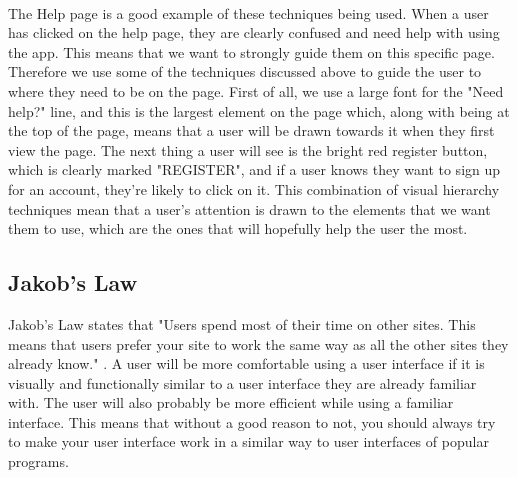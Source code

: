 \documentclass[a4paper, 11pt]{article}
\begin{document}
~\\
The Help page is a good example of these techniques being used. When a user has clicked on the help page, they are clearly confused and need help with using the app. This means that we want to strongly guide them on this specific page. Therefore we use some of the techniques discussed above to guide the user to where they need to be on the page. First of all, we use a large font for the "Need help?" line, and this is the largest element on the page which, along with being at the top of the page, means that a user will be drawn towards it when they first view the page. The next thing a user will see is the bright red register button, which is clearly marked "REGISTER", and if a user knows they want to sign up for an account, they're likely to click on it. This combination of visual hierarchy techniques mean that a user's attention is drawn to the elements that we want them to use, which are the ones that will hopefully help the user the most.

\subsection{Jakob's Law}

Jakob's Law states that "Users spend most of their time on other sites. This means that users prefer your site to work the same way as all the other sites they already know." \cite{jakobs}. A user will be more comfortable using a user interface if it is visually and functionally similar to a user interface they are already familiar with. The user will also probably be more efficient while using a familiar interface. This means that without a good reason to not, you should always try to make your user interface work in a similar way to user interfaces of popular programs.
\end{document}
